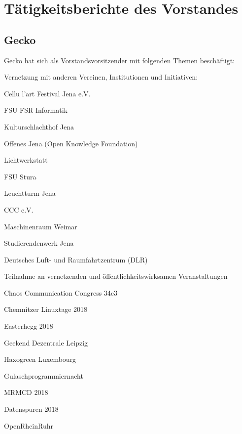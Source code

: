 \documentclass[ngerman]{scrartcl}
\begin{document}
\section{Tätigkeitsberichte des Vorstandes}

\subsection{Gecko}

Gecko hat sich als Vorstandsvorsitzender mit folgenden Themen beschäftigt:

\begin{compactitem}
    \item Vernetzung mit anderen Vereinen, Institutionen und Initiativen:
    \begin{compactitem}
        \item Cellu l'art Festival Jena e.V. 
        \item FSU FSR Informatik
        \item Kulturschlachthof Jena
        \item Offenes Jena (Open Knowledge Foundation)
        \item Lichtwerkstatt
        \item FSU Stura
        \item Leuchtturm Jena
        \item CCC e.V.
        \item Maschinenraum Weimar
        \item Studierendenwerk Jena
        \item Deutsches Luft- und Raumfahrtzentrum (DLR)
    \end{compactitem}
    \item Teilnahme an vernetzenden und öffentlichkeitswirksamen Veranstaltungen
    \begin{compactitem}
        \item Chaos Communication Congress 34c3
        \item Chemnitzer Linuxtage 2018
        \item Easterhegg 2018
        \item Geekend Dezentrale Leipzig
        \item Haxogreen Luxembourg
        \item Gulaschprogrammiernacht
        \item MRMCD 2018
        \item Datenspuren 2018
        \item OpenRheinRuhr
    \end{compactitem}

\end{compactitem}
\end{document}
